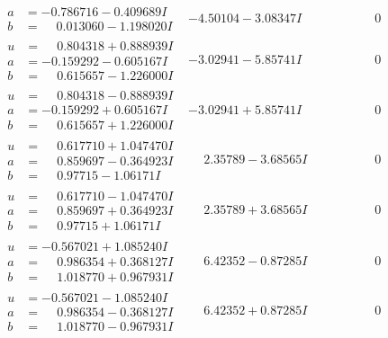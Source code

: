 \documentclass[1p]{elsarticle_modified}
\theoremstyle{definition}
\begin{document}
$$\begin{array}{c|c|c}
\begin{aligned}
a &= -0.786716 - 0.409689 I \\
b &= \phantom{-}0.013060 - 1.198020 I\end{aligned}
 & -4.50104 - 3.08347 I & \phantom{-0.000000 } 0 \\ \hline\begin{aligned}
u &= \phantom{-}0.804318 + 0.888939 I \\
a &= -0.159292 - 0.605167 I \\
b &= \phantom{-}0.615657 - 1.226000 I\end{aligned}
 & -3.02941 - 5.85741 I & \phantom{-0.000000 } 0 \\ \hline\begin{aligned}
u &= \phantom{-}0.804318 - 0.888939 I \\
a &= -0.159292 + 0.605167 I \\
b &= \phantom{-}0.615657 + 1.226000 I\end{aligned}
 & -3.02941 + 5.85741 I & \phantom{-0.000000 } 0 \\ \hline\begin{aligned}
u &= \phantom{-}0.617710 + 1.047470 I \\
a &= \phantom{-}0.859697 - 0.364923 I \\
b &= \phantom{-}0.97715 - 1.06171 I\end{aligned}
 & \phantom{-}2.35789 - 3.68565 I & \phantom{-0.000000 } 0 \\ \hline\begin{aligned}
u &= \phantom{-}0.617710 - 1.047470 I \\
a &= \phantom{-}0.859697 + 0.364923 I \\
b &= \phantom{-}0.97715 + 1.06171 I\end{aligned}
 & \phantom{-}2.35789 + 3.68565 I & \phantom{-0.000000 } 0 \\ \hline\begin{aligned}
u &= -0.567021 + 1.085240 I \\
a &= \phantom{-}0.986354 + 0.368127 I \\
b &= \phantom{-}1.018770 + 0.967931 I\end{aligned}
 & \phantom{-}6.42352 - 0.87285 I & \phantom{-0.000000 } 0 \\ \hline\begin{aligned}
u &= -0.567021 - 1.085240 I \\
a &= \phantom{-}0.986354 - 0.368127 I \\
b &= \phantom{-}1.018770 - 0.967931 I\end{aligned}
 & \phantom{-}6.42352 + 0.87285 I & \phantom{-0.000000 } 0\\

\end{array}$$
\end{document}

